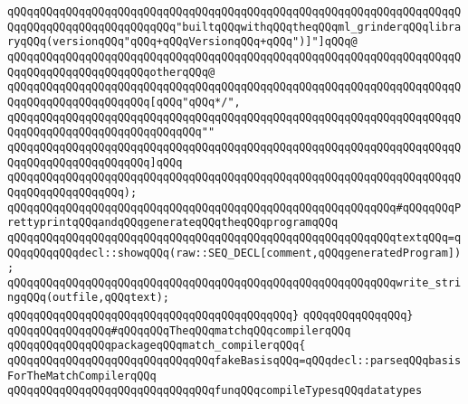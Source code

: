 \verb|qQQqqQQqqQQqqQQqqQQqqQQqqQQqqQQqqQQqqQQqqQQqqQQqqQQqqQQqqQQqqQQqqQQqqQQqqQQqqQQqqQQqqQQqqQQqqQQq"builtqQQqwithqQQqtheqQQqml_grinderqQQqlibraryqQQq(versionqQQq"qQQq+qQQqVersionqQQq+qQQq")]"]qQQq@|\newline
\verb|qQQqqQQqqQQqqQQqqQQqqQQqqQQqqQQqqQQqqQQqqQQqqQQqqQQqqQQqqQQqqQQqqQQqqQQqqQQqqQQqqQQqqQQqqQQqotherqQQq@|\newline
\verb|qQQqqQQqqQQqqQQqqQQqqQQqqQQqqQQqqQQqqQQqqQQqqQQqqQQqqQQqqQQqqQQqqQQqqQQqqQQqqQQqqQQqqQQqqQQq[qQQq"qQQq*/",|\newline
\verb|qQQqqQQqqQQqqQQqqQQqqQQqqQQqqQQqqQQqqQQqqQQqqQQqqQQqqQQqqQQqqQQqqQQqqQQqqQQqqQQqqQQqqQQqqQQqqQQqqQQq""|\newline
\verb|qQQqqQQqqQQqqQQqqQQqqQQqqQQqqQQqqQQqqQQqqQQqqQQqqQQqqQQqqQQqqQQqqQQqqQQqqQQqqQQqqQQqqQQqqQQq]qQQq|\newline
\verb|qQQqqQQqqQQqqQQqqQQqqQQqqQQqqQQqqQQqqQQqqQQqqQQqqQQqqQQqqQQqqQQqqQQqqQQqqQQqqQQqqQQqqQQq);|\newline
\newline
\verb|qQQqqQQqqQQqqQQqqQQqqQQqqQQqqQQqqQQqqQQqqQQqqQQqqQQqqQQqqQQq#qQQqqQQqPrettyprintqQQqandqQQqgenerateqQQqtheqQQqprogramqQQq|\newline
\newline
\verb|qQQqqQQqqQQqqQQqqQQqqQQqqQQqqQQqqQQqqQQqqQQqqQQqqQQqqQQqqQQqtextqQQq=qQQqqQQqqQQqdecl::showqQQq(raw::SEQ_DECL[comment,qQQqgeneratedProgram]);|\newline
\newline
\verb|qQQqqQQqqQQqqQQqqQQqqQQqqQQqqQQqqQQqqQQqqQQqqQQqqQQqqQQqqQQqwrite_stringqQQq(outfile,qQQqtext);|\newline
\verb|qQQqqQQqqQQqqQQqqQQqqQQqqQQqqQQqqQQqqQQqqQQq}|\newline
\verb|qQQqqQQqqQQqqQQq}|\newline
\newline
\newline
\newline
\verb|qQQqqQQqqQQqqQQq#qQQqqQQqTheqQQqmatchqQQqcompilerqQQq|\newline
\verb|qQQqqQQqqQQqqQQqpackageqQQqmatch_compilerqQQq{|\newline
\newline
\newline
\verb|qQQqqQQqqQQqqQQqqQQqqQQqqQQqqQQqfakeBasisqQQq=qQQqdecl::parseqQQqbasisForTheMatchCompilerqQQq|\newline
\newline
\verb|qQQqqQQqqQQqqQQqqQQqqQQqqQQqqQQqfunqQQqcompileTypesqQQqdatatypes|\newline

